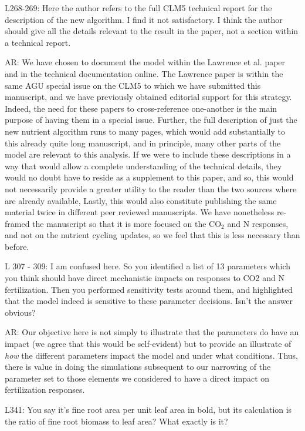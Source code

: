 \documentclass{article}
\begin{document}
L268-269: Here the author refers to the full CLM5 technical report for the description of the new algorithm. I find it not satisfactory. I think the author should give all the details relevant to the result in the paper, not a section within a technical report. 

\textsf{AR: We have chosen to document the model within the Lawrence et al. paper and in the technical documentation online. The Lawrence paper is within the same AGU special issue on the CLM5 to which we have submitted this manuscript, and we have previously obtained editorial support for this strategy. Indeed, the need for these papers to cross-reference one-another is the main purpose of having them in a special issue.  Further, the full description of just the new nutrient algorithm runs to many pages, which would add substantially to this already quite long manuscript, and in principle, many other parts of the model are relevant to this analysis. If we were to include these descriptions in a way that would allow a complete understanding of the technical details, they would no doubt have to reside as a supplement to this paper, and so,  this would not necessarily provide a greater utility to the reader than the two sources where are already available, Lastly, this would also constitute publishing the same material twice in different peer reviewed manuscripts.  We have nonetheless re-framed the manuscript so that it is more focused on the CO$_{2}$ and N responses, and not on the nutrient cycling updates, so we feel that this is less necessary than before.}

L 307 - 309: I am confused here. So you identified a list of 13 parameters which you think should have direct mechanistic impacts on responses to CO2 and N fertilization. Then you performed sensitivity tests around them, and highlighted that the model indeed is sensitive to these parameter decisions. Isn't the answer obvious? 

\textsf{AR: Our objective here is not simply to illustrate that the parameters do have an impact (we agree that this would be self-evident) but to provide an illustrate of \emph{how} the different parameters impact the model and under what conditions.  Thus, there is value in doing the simulations subsequent to our narrowing of the parameter set to those elements we considered to have a direct impact on fertilization responses. }

L341: You say it's fine root area per unit leaf area in bold, but its calculation is the ratio of fine root biomass to leaf area? What exactly is it?
\end{document}
